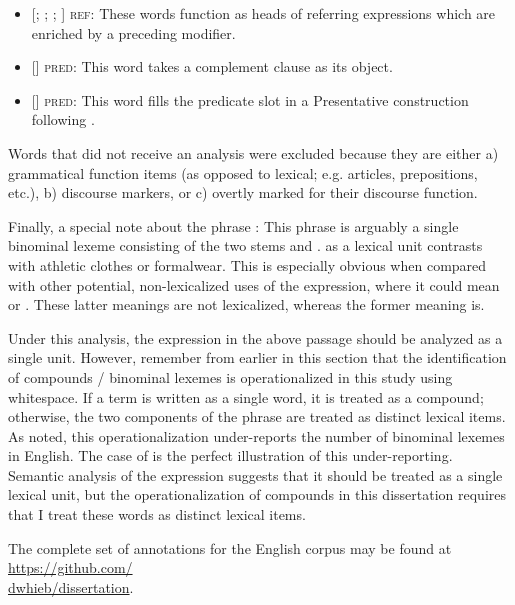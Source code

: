 \begin{itemize}
  \item {[; ; ; ]} \textsc{ref:} These words function as heads of referring expressions which are enriched by a preceding modifier.
  \item {[]} \textsc{pred:} This word takes a complement clause as its object.
  \item {[]} \textsc{pred:} This word fills the predicate slot in a Presentative \parencite[1408]{Quirketal1985} construction following .
\end{itemize}

Words that did not receive an analysis were excluded because they are either a) grammatical function items (as opposed to lexical; e.g. articles, prepositions, etc.), b) discourse markers, or c) overtly marked for their discourse function.

Finally, a special note about the phrase : This phrase is arguably a single binominal lexeme consisting of the two stems  and .  as a lexical unit contrasts with athletic clothes or formalwear. This is especially obvious when compared with other potential, non-lexicalized uses of the expression, where it could mean  or . These latter meanings are not lexicalized, whereas the former meaning is.

Under this analysis, the expression  in the above passage should be analyzed as a single unit. However, remember from earlier in this section that the identification of compounds / binominal lexemes is operationalized in this study using whitespace. If a term is written as a single word, it is treated as a compound; otherwise, the two components of the phrase are treated as distinct lexical items. As noted, this operationalization under-reports the number of binominal lexemes in English. The case of  is the perfect illustration of this under-reporting. Semantic analysis of the expression  suggests that it should be treated as a single lexical unit, but the operationalization of compounds in this dissertation requires that I treat these words as distinct lexical items.

The complete set of annotations for the English corpus may be found at \href{https://github.com/dwhieb/dissertation}{https://github.com/\\dwhieb/dissertation}.

